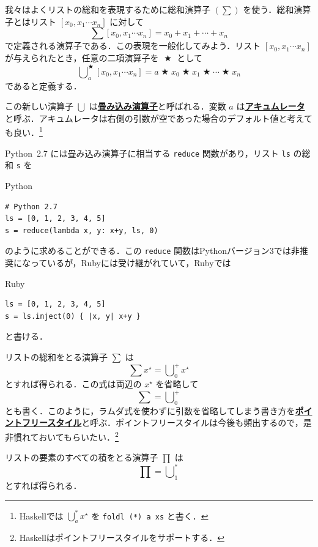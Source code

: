 \documentclass[a4paper,twocolumn]{jsbook}
\newcommand{\programminglanguage}[1]{\textsf{#1}}
\newcommand{\haskell}{\programminglanguage{Haskell}}
\newcommand{\python}{\programminglanguage{Python}}
\newcommand{\ruby}{\programminglanguage{Ruby}}
\newcommand{\keyword}[1]{{\underline{\textbf{#1}}}}
\newcommand{\code}[1]{\texttt{#1}}
\newenvironment{pythoncode}{\begin{itembox}[r]{\python}}{\end{itembox}}
\newenvironment{rubycode}{\begin{itembox}[r]{\ruby}}{\end{itembox}}
\DeclareMathOperator{\mBinOp}{\bigstar}
\DeclareMathOperator*{\mFold}{\bigcup}
\newcommand{\mListWith}[1]{\left[#1\right]}
\newcommand{\mList}[1]{{#1}^\mathrm{\star}}
\begin{document}
我々はよくリストの総和を表現するために総和演算子 $(\sum)$ を使う．総和演算子とはリスト $\mListWith{x_0,x_1\dotsb x_n}$ に対して
\begin{equation}
\sum\mListWith{x_0,x_1\dotsb x_n}=x_0+x_1+\dotsb+x_n
\end{equation}
で定義される演算子である．この表現を一般化してみよう．リスト $\mListWith{x_0,x_1\dotsb x_n}$ が与えられたとき，任意の二項演算子を $\mBinOp$ として
\begin{equation}
\mFold^{\mBinOp}_a\mListWith{x_0,x_1\dotsb x_n}
=a\mBinOp x_0\mBinOp x_1\mBinOp\dotsb\mBinOp x_n
\end{equation}
であると定義する．

この新しい演算子 $\mFold$ は\keyword{畳み込み演算子}と呼ばれる．変数 $a$ は\keyword{アキュムレータ}と呼ぶ．アキュムレータは右側の引数が空であった場合のデフォルト値と考えても良い．\footnote{\haskell では $\mFold^*_a\mList{x}$ を \code{foldl (*) a xs} と書く．}

\python\ 2.7 には畳み込み演算子に相当する \code{reduce} 関数があり，リスト \code{ls} の総和 \code{s} を
\begin{pythoncode}
\begin{verbatim}
# Python 2.7
ls = [0, 1, 2, 3, 4, 5]
s = reduce(lambda x, y: x+y, ls, 0)
\end{verbatim}
\end{pythoncode}
のように求めることができる．この \code{reduce} 関数は\python バージョン3では非推奨になっているが，\ruby には受け継がれていて，\ruby では
\begin{rubycode}
\begin{verbatim}
ls = [0, 1, 2, 3, 4, 5]
s = ls.inject(0) { |x, y| x+y }
\end{verbatim}
\end{rubycode}
と書ける．

リストの総和をとる演算子 $\sum$ は
\begin{equation}
\sum\mList{x}=\mFold^+_0\mList{x}
\end{equation}
とすれば得られる．この式は両辺の $\mList{x}$ を省略して
\begin{equation}
\sum=\mFold^+_0
\end{equation}
とも書く．このように，ラムダ式を使わずに引数を省略してしまう書き方を\keyword{ポイントフリースタイル}と呼ぶ．ポイントフリースタイルは今後も頻出するので，是非慣れておいてもらいたい．\footnote{\haskell はポイントフリースタイルをサポートする．}

リストの要素のすべての積をとる演算子 $\prod$ は
\begin{equation}
\prod=\mFold^*_1
\end{equation}
とすれば得られる．
\end{document}
